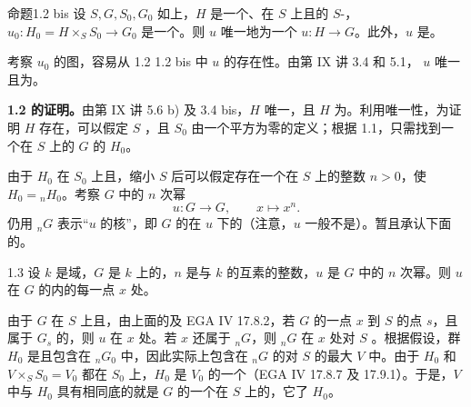 \begin{SGAresult}{命题}{1.2 bis}
设 $S,G,S_0,G_0$ 如上，$H$ 是一个、在 $S$ 上且的 $S$-，$u_0:H_0=H\times_S S_0\to G_0$ 是一个。则 $u$ 唯一地为一个 $u:H\to G$。此外，$u$ 是。
\end{SGAresult}
考察 $u_0$ 的图，容易从 1.2  1.2 bis 中 $u$ 的存在性。由第 IX 讲 3.4 和 5.1， $u$ 唯一且为。

\textbf{1.2 的证明。}由第 IX 讲 5.6 b) 及 3.4 bis，$H$ 唯一，且 $H$ 为。利用唯一性，为证明 $H$ 存在，可以假定 $S$ ，且 $S_0$ 由一个平方为零的定义；根据 1.1，只需找到一个在 $S$ 上的 $G$ 的 $H_0$。

由于 $H_0$ 在 $S_0$ 上且，缩小 $S$ 后可以假定存在一个在 $S$ 上的整数 $n>0$，使 $H_0={}_nH_0$。考察 $G$ 中的 $n$ 次幂
\[u:G\longrightarrow G,\qquad x\longmapsto x^n.\]
仍用 ${}_nG$ 表示“$u$ 的核”，即 $G$ 的在 $u$ 下的（注意，$u$ 一般不是）。暂且承认下面的。
\begin{SGAresult}{}{1.3}
设 $k$ 是域，$G$ 是 $k$ 上的，$n$ 是与 $k$ 的互素的整数，$u$ 是 $G$ 中的 $n$ 次幂。则 $u$ 在 $G$ 的内的每一点 $x$ 处。
\end{SGAresult}
由于 $G$ 在 $S$ 上且，由上面的及 EGA IV 17.8.2，若 $G$ 的一点 $x$ 到 $S$ 的点 $s$，且属于 $G_s$ 的，则 $u$ 在 $x$ 处。若 $x$ 还属于 ${}_nG$，则 ${}_nG$ 在 $x$ 处对 $S$ 。根据假设，群 $H_0$ 是且包含在 ${}_nG_0$ 中，因此实际上包含在 ${}_nG$ 的对 $S$ 的最大 $V$ 中。由于 $H_0$ 和 $V\times_S S_0=V_0$ 都在 $S_0$ 上，$H_0$ 是 $V_0$ 的一个（EGA IV 17.8.7 及 17.9.1）。于是，$V$ 中与 $H_0$ 具有相同底的就是 $G$ 的一个在 $S$ 上的，它了 $H_0$。

